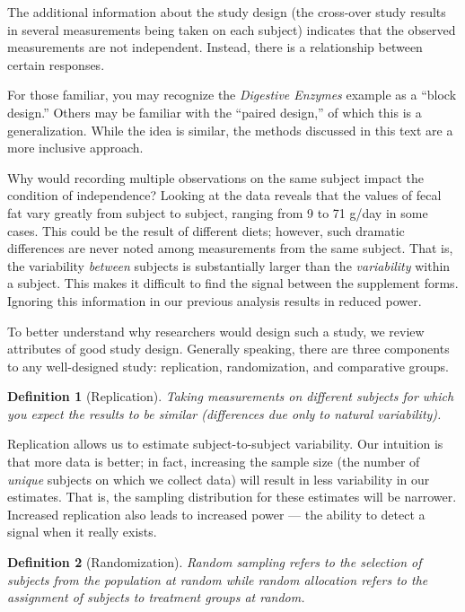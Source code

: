 \documentclass[
]{book}
\theoremstyle{plain}
\theoremstyle{mydefn}
\newtheorem{definition}{Definition}[chapter]
\theoremstyle{myexmpl}
\theoremstyle{remark}
\begin{document}
The additional information about the study design (the cross-over study results in several measurements being taken on each subject) indicates that the observed measurements are not independent. Instead, there is a relationship between certain responses.

\begin{rmdtip}
For those familiar, you may recognize the \emph{Digestive Enzymes} example as a ``block design.'' Others may be familiar with the ``paired design,'' of which this is a generalization. While the idea is similar, the methods discussed in this text are a more inclusive approach.
\end{rmdtip}

Why would recording multiple observations on the same subject impact the condition of independence? Looking at the data reveals that the values of fecal fat vary greatly from subject to subject, ranging from 9 to 71 g/day in some cases. This could be the result of different diets; however, such dramatic differences are never noted among measurements from the same subject. That is, the variability \emph{between} subjects is substantially larger than the \emph{variability} within a subject. This makes it difficult to find the signal between the supplement forms. Ignoring this information in our previous analysis results in reduced power.

To better understand why researchers would design such a study, we review attributes of good study design. Generally speaking, there are three components to any well-designed study: replication, randomization, and comparative groups.

\begin{definition}[Replication]
\protect\hypertarget{def:defn-replication}{}{\label{def:defn-replication} {} }Taking measurements on different subjects for which you expect the results to be similar (differences due only to natural variability).
\end{definition}

Replication allows us to estimate subject-to-subject variability. Our intuition is that more data is better; in fact, increasing the sample size (the number of \emph{unique} subjects on which we collect data) will result in less variability in our estimates. That is, the sampling distribution for these estimates will be narrower. Increased replication also leads to increased power --- the ability to detect a signal when it really exists.

\begin{definition}[Randomization]
\protect\hypertarget{def:defn-randomization}{}{\label{def:defn-randomization} {} }Random sampling refers to the selection of subjects from the population at random while random allocation refers to the assignment of subjects to treatment groups at random.
\end{definition}
\end{document}
